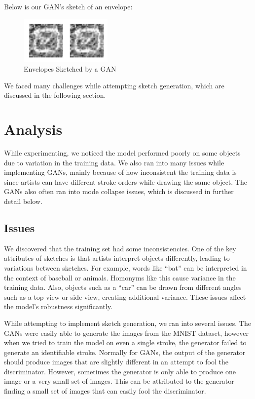 \documentclass[10pt,twocolumn,letterpaper]{article}
\begin{document}
Below is our GAN’s sketch of an envelope:

\begin{figure}[H]
  \centering
  \includegraphics[width=0.4\textwidth]{gan_sketch.png}
  \caption{Envelopes Sketched by a GAN}
\end{figure}

We faced many challenges while attempting sketch generation, which are discussed in the following section.

\section{Analysis}

While experimenting, we noticed the model performed poorly on some objects due to variation in the training data. We also ran into many issues while implementing GANs, mainly because of how inconsistent the training data is since artists can have different stroke orders while drawing the same object. The GANs also often ran into mode collapse issues, which is discussed in further detail below.

\subsection{Issues}

We discovered that the training set had some inconsistencies. One of the key attributes of sketches is that artists interpret objects differently, leading to variations between sketches. For example, words like ``bat'' can be interpreted in the context of baseball or animals. Homonyms like this cause variance in the training data. Also, objects such as a ``car'' can be drawn from different angles such as a top view or side view, creating additional variance. These issues affect the model’s robustness significantly.

While attempting to implement sketch generation, we ran into several issues. The GANs were easily able to generate the images from the MNIST dataset, however when we tried to train the model on even a single stroke, the generator failed to generate an identifiable stroke. Normally for GANs, the output of the generator should produce images that are slightly different in an attempt to fool the discriminator. However, sometimes the generator is only able to produce one image or a very small set of images. This can be attributed to the generator finding a small set of images that can easily fool the discriminator. 
\end{document}
